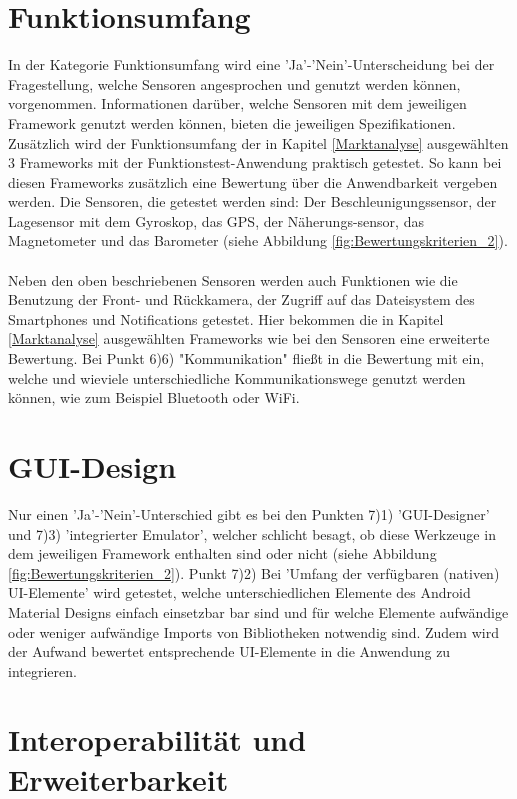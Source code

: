\section{Funktionsumfang}

In der Kategorie Funktionsumfang wird eine 'Ja'-'Nein'-Unterscheidung bei der Fragestellung, welche Sensoren angesprochen und genutzt werden können, vorgenommen. Informationen darüber, welche Sensoren mit dem jeweiligen Framework genutzt werden können, bieten die jeweiligen Spezifikationen. Zusätzlich wird der Funktionsumfang der in Kapitel \ref{Marktanalyse} ausgewählten 3 Frameworks mit der Funktionstest-Anwendung praktisch getestet. So kann bei diesen Frameworks zusätzlich eine Bewertung über die Anwendbarkeit vergeben werden. Die Sensoren, die getestet werden sind: Der Beschleunigungssensor, der Lagesensor mit dem Gyroskop, das GPS, der Näherungs-sensor, das Magnetometer und das Barometer (siehe Abbildung \ref{fig:Bewertungskriterien_2}). 
\\
\\
Neben den oben beschriebenen Sensoren werden auch Funktionen wie die Benutzung der Front- und Rückkamera, der Zugriff auf das Dateisystem des Smartphones und Notifications getestet. Hier bekommen die in Kapitel \ref{Marktanalyse} ausgewählten Frameworks wie bei den Sensoren eine erweiterte Bewertung. Bei Punkt 6)6) "Kommunikation" fließt in die Bewertung mit ein, welche und wieviele unterschiedliche Kommunikationswege genutzt werden können, wie zum Beispiel Bluetooth oder WiFi. 

\section{GUI-Design}

Nur einen 'Ja'-'Nein'-Unterschied gibt es bei den Punkten 7)1) 'GUI-Designer' und 7)3) 'integrierter Emulator', welcher schlicht besagt, ob diese Werkzeuge in dem jeweiligen Framework enthalten sind oder nicht (siehe Abbildung \ref{fig:Bewertungskriterien_2}). Punkt 7)2) Bei 'Umfang der verfügbaren (nativen) UI-Elemente' wird getestet, welche unterschiedlichen Elemente des Android Material Designs einfach einsetzbar bar sind und für welche Elemente aufwändige oder weniger aufwändige Imports von Bibliotheken notwendig sind. Zudem wird der Aufwand bewertet entsprechende UI-Elemente in die Anwendung zu integrieren. 

\section{Interoperabilität und Erweiterbarkeit}

